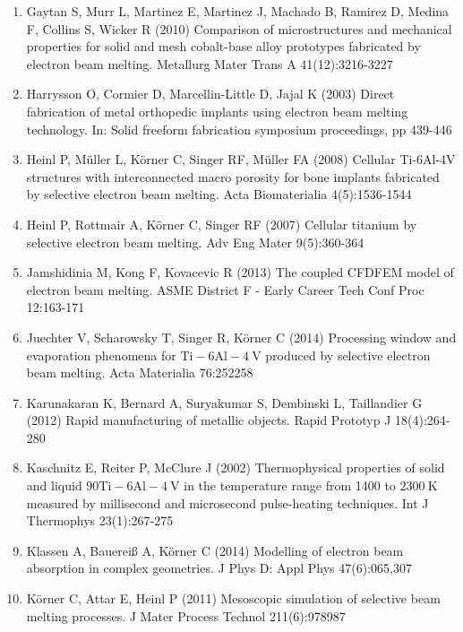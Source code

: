 \documentclass[10pt]{article}
\begin{document}
\begin{enumerate}
  \item Gaytan S, Murr L, Martinez E, Martinez J, Machado B, Ramirez D, Medina F, Collins S, Wicker R (2010) Comparison of microstructures and mechanical properties for solid and mesh cobalt-base alloy prototypes fabricated by electron beam melting. Metallurg Mater Trans A 41(12):3216-3227

  \item Harrysson O, Cormier D, Marcellin-Little D, Jajal K (2003) Direct fabrication of metal orthopedic implants using electron beam melting technology. In: Solid freeform fabrication symposium proceedings, pp 439-446

  \item Heinl P, Müller L, Körner C, Singer RF, Müller FA (2008) Cellular Ti-6Al-4V structures with interconnected macro porosity for bone implants fabricated by selective electron beam melting. Acta Biomaterialia 4(5):1536-1544

  \item Heinl P, Rottmair A, Körner C, Singer RF (2007) Cellular titanium by selective electron beam melting. Adv Eng Mater 9(5):360-364

  \item Jamshidinia M, Kong F, Kovacevic R (2013) The coupled CFDFEM model of electron beam melting. ASME District F - Early Career Tech Conf Proc 12:163-171

  \item Juechter V, Scharowsky T, Singer R, Körner C (2014) Processing window and evaporation phenomena for $\mathrm{Ti}-6 \mathrm{Al}-4 \mathrm{~V}$ produced by selective electron beam melting. Acta Materialia 76:252258

  \item Karunakaran K, Bernard A, Suryakumar S, Dembinski L, Taillandier G (2012) Rapid manufacturing of metallic objects. Rapid Prototyp J 18(4):264-280

  \item Kaschnitz E, Reiter P, McClure J (2002) Thermophysical properties of solid and liquid $90 \mathrm{Ti}-6 \mathrm{Al}-4 \mathrm{~V}$ in the temperature range from 1400 to $2300 \mathrm{~K}$ measured by millisecond and microsecond pulse-heating techniques. Int J Thermophys 23(1):267-275

  \item Klassen A, Bauereiß A, Körner C (2014) Modelling of electron beam absorption in complex geometries. J Phys D: Appl Phys 47(6):065,307

  \item Körner C, Attar E, Heinl P (2011) Mesoscopic simulation of selective beam melting processes. J Mater Process Technol 211(6):978987


\end{enumerate}
\end{document}
